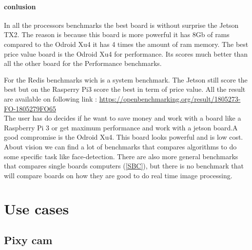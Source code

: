 \documentclass[english]{book_template} %
\begin{document}
\subsubsection{conlusion}

In all the processors benchmarks the best board is without surprise the Jetson TX2. The reason is because this board is more powerful it has 8Gb of rams compared to the Odroid Xu4 it has 4 times the amount of ram memory. 
The best price value board is the Odroid Xu4 for performance. Its scores much better than all the other board for the Performance benchmarks.

For the Redis benchmarks wich is a system benchmark. The Jetson still score the best but on the Rasperry Pi3 score the best in term of price value. 
All the result are available on following link : \url{https://openbenchmarking.org/result/1805273-FO-1805279FO65}\\


%


The user has do decides if he want to save money and work with a board like a  Raspberry Pi 3 or get maximum performance and work with a jetson board.A good compromise is the Odroid Xu4. This board looks powerful and is low cost. \\


About vision we can find a lot of benchmarks that compares algorithms to do some specific task like face-detection. There are also more general benchmarks that compares single boards computers (\ref{SBC}), but there is no benchmark that will compare boards on how they are good to do real time image processing.

\chapter{Use cases}

\section{Pixy cam}
\end{document}
